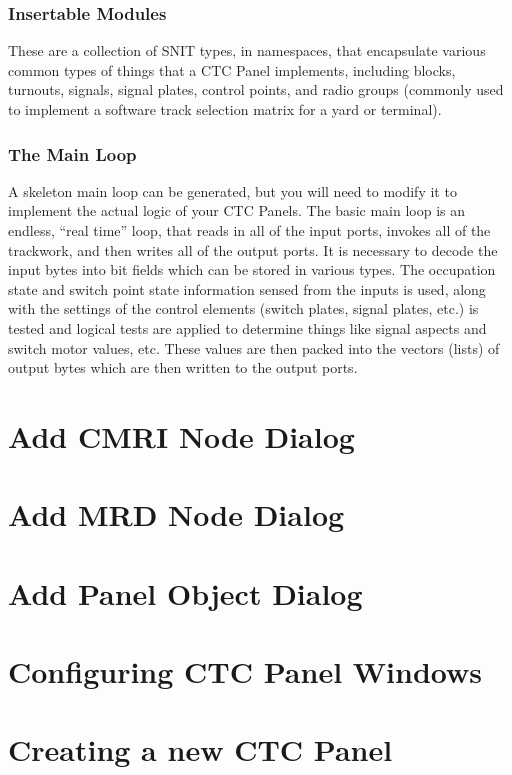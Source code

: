 \subsubsection{Insertable Modules}

These are a collection of SNIT types, in namespaces, that encapsulate
various common types of things that a CTC Panel implements, including
blocks, turnouts, signals, signal plates, control points, and radio
groups (commonly used to implement a software track selection matrix for
a yard or terminal).

\subsubsection{The Main Loop}

A skeleton main loop can be generated, but you will need to modify it to
implement the actual logic of your CTC Panels.  The basic main loop is an
endless, ``real time'' loop, that reads in all of the input ports,
invokes all of the trackwork, and then writes all of the output ports. 
It is necessary to decode the input bytes into bit fields which can be
stored in various types.  The occupation state and switch point state
information sensed from the inputs is used, along with the settings of
the control elements (switch plates, signal plates, etc.) is tested and
logical tests are applied to determine things like signal aspects and
switch motor values, etc. These values are then packed into the vectors
(lists) of output bytes which are then written to the output ports.

\section{Add CMRI Node Dialog}
\section{Add MRD Node Dialog}
\section{Add Panel Object Dialog}
\section{Configuring CTC Panel Windows}
\section{Creating a new CTC Panel}
